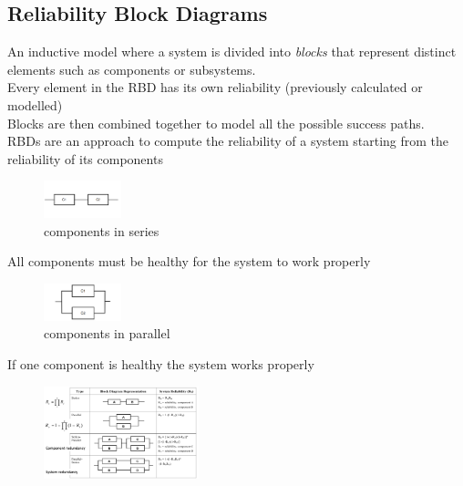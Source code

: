 \documentclass[10pt, oneside]{article}
\begin{document}
\subsection{Reliability Block Diagrams}
An inductive model where a system is divided into {\sl blocks} that represent distinct elements such as components or subsystems.\\
Every element in the RBD has its own reliability (previously calculated or modelled)\\
Blocks are then combined together to model all the possible success paths.\\RBDs are an approach to compute the reliability of a system starting from the reliability of its components
\begin{multicols}{2}
    \begin{figure}[H]
        \begin{center}
        \includegraphics[width=0.2\textwidth]{img/img86.png}
        \caption{components in series}
        \end{center}
    \end{figure}All components must be healthy for the system to work properly\columnbreak
    \begin{figure}[H]
        \begin{center}
        \includegraphics[width=0.2\textwidth]{img/img87.png}
        \caption{components in parallel}
        \end{center}
    \end{figure}If one component is healthy the system works properly
\end{multicols}
\begin{figure}[H]
    \begin{center}
    \includegraphics[width=0.4\textwidth]{img/img88.png}
    \end{center}
\end{figure}
\end{document}
